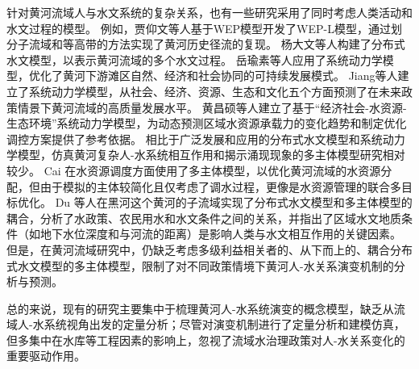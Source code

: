 针对黄河流域人与水文系统的复杂关系，也有一些研究采用了同时考虑人类活动和水文过程的模型。
例如，贾仰文等人基于WEP模型开发了WEP-L模型，通过划分子流域和等高带的方法实现了黄河历史径流的复现\cite{jiayangwen2005}。
杨大文等人构建了分布式水文模型，以表示黄河流域的多个水文过程\cite{yangdawen2004}。
岳瑜素等人应用了系统动力学模型，优化了黄河下游滩区自然、经济和社会协同的可持续发展模式\cite{yueyusu2020}。
Jiang等人建立了系统动力学模型，从社会、经济、资源、生态和文化五个方面预测了在未来政策情景下黄河流域的高质量发展水平\cite{jiang2021b}。
黄昌硕等人建立了基于“经济社会-水资源-生态环境”系统动力学模型，为动态预测区域水资源承载力的变化趋势和制定优化调控方案提供了参考依据\cite{huangchangshuo2021}。
相比于广泛发展和应用的分布式水文模型和系统动力学模型，仿真黄河复杂人-水系统相互作用和揭示涌现现象的多主体模型研究相对较少。
Cai 在水资源调度方面使用了多主体模型，以优化黄河流域的水资源分配，但由于模拟的主体较简化且仅考虑了调水过程，更像是水资源管理的联合多目标优化\cite{cai2011}。
Du 等人在黑河这个黄河的子流域实现了分布式水文模型和多主体模型的耦合，分析了水政策、农民用水和水文条件之间的关系，并指出了区域水文地质条件（如地下水位深度和与河流的距离）是影响人类与水文相互作用的关键因素\cite{du2020}。
但是，在黄河流域研究中，仍缺乏考虑多级利益相关者的、从下而上的、耦合分布式水文模型的多主体模型，限制了对不同政策情境下黄河人-水关系演变机制的分析与预测。

总的来说，现有的研究主要集中于梳理黄河人-水系统演变的概念模型，缺乏从流域人-水系统视角出发的定量分析；尽管对演变机制进行了定量分析和建模仿真，但多集中在水库等工程因素的影响上，忽视了流域水治理政策对人-水关系变化的重要驱动作用。

